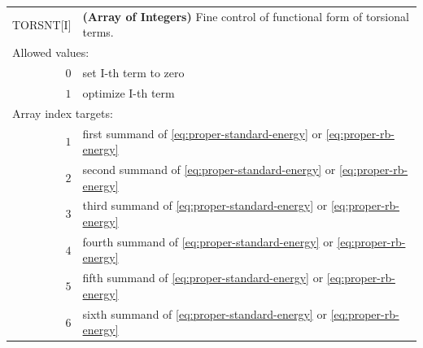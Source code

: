 \documentclass[10pt,a4paper,openany]{memoir}
\numberwithin{equation}{section}
\begin{document}
{
\begin{tabular}{r@{ : }l}
\label{descr:torsnt}
    TORSNT[I]&\textbf{(Array of Integers)} Fine control of functional form of torsional terms.                                               \\ 
\multicolumn{2}{l}{Allowed values:} \\ 
     \(0\)&set I-th term to zero                                                                                \\ 
     \(1\)&optimize I-th term                                                                                   \\ 
\multicolumn{2}{l}{Array index targets:} \\ 
     \(1\)&first summand of \autoref{eq:proper-standard-energy} or \autoref{eq:proper-rb-energy}                                                                                          \\ 
     \(2\)&second summand of \autoref{eq:proper-standard-energy} or \autoref{eq:proper-rb-energy}                                                                                         \\ 
     \(3\)&third summand of \autoref{eq:proper-standard-energy} or \autoref{eq:proper-rb-energy}                                                                                          \\ 
     \(4\)&fourth summand of \autoref{eq:proper-standard-energy} or \autoref{eq:proper-rb-energy}                                                                                         \\ 
     \(5\)&fifth summand of \autoref{eq:proper-standard-energy} or \autoref{eq:proper-rb-energy}                                                                                          \\ 
     \(6\)&sixth summand of \autoref{eq:proper-standard-energy} or \autoref{eq:proper-rb-energy}                                                                                          \\ 
\end{tabular}
\vspace{1ex}
}
\end{document}
